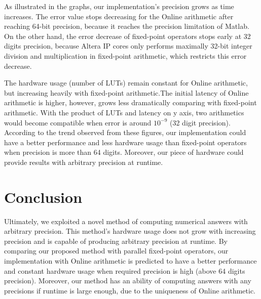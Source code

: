 \documentclass{sig-alternate}
\begin{document}
As illustrated in the graphs, our implementation's precision grows as time increases. The error value stops decreasing for the Online arithmetic after reaching 64-bit precision, because it reaches the precision limitation of Matlab. On the other hand, the error decrease of fixed-point operators stops early at 32 digits precision, because Altera IP cores only performs maximally 32-bit integer division and multiplication in fixed-point arithmetic\cite{altera}, which restricts this error decrease.    

The hardware usage (number of LUTs) remain constant for Online arithmetic, but increasing heavily with fixed-point arithmetic.The initial latency of Online arithmetic is higher, however, grows less dramatically comparing with fixed-point arithmetic. With the product of LUTs and latency on y axis, two arithmetics would become compatible when error is around $10^{-9}$ (32 digit precision). According to the trend observed from these figures, our implementation could have a better performance and less hardware usage than fixed-point operators when precision is more than 64 digits. Moreover, our piece of hardware could provide results with arbitrary precision at runtime.

\section{Conclusion}
Ultimately, we exploited a novel method of computing numerical answers with arbitrary precision. This method's hardware usage does not grow with increasing precision and is capable of producing arbitrary precision at runtime. By comparing our proposed method with parallel fixed-point operators, our implementation with Online arithmetic is predicted to have a better performance and constant hardware usage when required precision is high (above 64 digits precision). Moreover, our method has an ability of computing answers with any precisions if runtime is large enough, due to the uniqueness of Online arithmetic.  


	 
	
	
\end{document}
